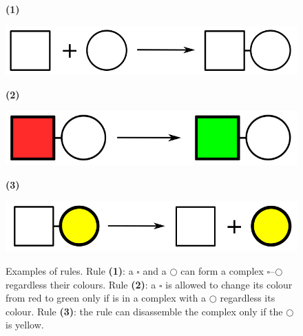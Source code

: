 \documentclass[12pt, twoside]{fithesis2} %
\begin{document}
\begin{figure}[!h]
\begin{center}
\begin{minipage}[l]{0.1\textwidth}
    \textbf{(1)}
  \end{minipage}
  \begin{minipage}[r]{0.6\textwidth}
    {\hspace*{0.8cm}\includegraphics[scale=0.2]{pics/rule_complex}}
\end{minipage}

\begin{minipage}[l]{0.1\textwidth}
    \textbf{(2)}
  \end{minipage}
  \begin{minipage}[r]{0.6\textwidth}
    {\hspace*{1.35cm}\includegraphics[scale=0.2]{pics/rule_change}}
\end{minipage}

\begin{minipage}[l]{0.1\textwidth}
    \textbf{(3)}
  \end{minipage}
  \begin{minipage}[r]{0.6\textwidth}
    {\hspace*{1.3cm}\includegraphics[scale=0.2]{pics/rule_diss}}
\end{minipage}
\end{center}
\caption{Examples of rules. Rule \textbf{(1)}: a {\large $\square$} and a $\bigcirc$ can form a complex {\large $\square$}--$\bigcirc$ regardless their colours. Rule \textbf{(2)}: a {\large $\square$} is allowed to change its colour from red to green only if is in a complex with a $\bigcirc$ regardless its colour. Rule \textbf{(3)}: the rule can disassemble the complex only if the $\bigcirc$ is yellow.}\label{rules:fig}
\end{figure}
\end{document}
